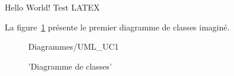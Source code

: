 \documentclass[12pt]{article}
\begin{document}
Hello World!
Test LATEX

La figure~\ref{UC1} présente le premier diagramme de classes imaginé. 
    \begin{figure}[h]
        {Diagrammes/UML_UC1}
        \caption{'Diagramme de classes'\label{UC1}}
    \end{figure}
\end{document}
